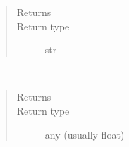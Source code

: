 \documentclass[letterpaper,10pt,english]{sphinxmanual}
\begin{document}
\begin{fulllineitems}
\begin{fulllineitems}
\begin{quote}
\begin{description}
\begin{itemize}
\end{itemize}

\item[{Returns}] \leavevmode
{}

\item[{Return type}] \leavevmode
str

\end{description}\end{quote}

\end{fulllineitems}


\begin{fulllineitems}
\label{\detokenize{Reference:salabim.Pdf.sample}}~\begin{quote}\begin{description}
\item[{Returns}] \leavevmode
{}

\item[{Return type}] \leavevmode
any (usually float)

\end{description}\end{quote}

\end{fulllineitems}


\end{fulllineitems}

\end{document}
